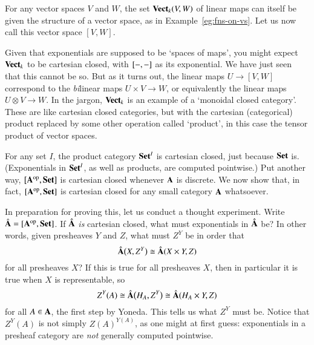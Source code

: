 \begin{remark}
For any vector spaces $V$ and $W$, the set $\mathbf{Vect}_k(V, W)$ of linear maps
can itself be given the structure of a vector space, as in
Example~\ref{eg:fns-on-vs}.  Let us now call this vector space $[V, W]$.

Given that exponentials are supposed to be `spaces of maps', you might
expect $\mathbf{Vect}_k$ to be cartesian closed, with $[-, -]$ as its
exponential.  We have just seen that this cannot be so.  But as it turns
out, the linear maps $U \to [V, W]$ correspond to the \emph{bi}linear%
%
%
maps $U \times V \to W$, or equivalently the linear maps $U \otimes V \to
W$.%
%
%
In the jargon, $\mathbf{Vect}_k$ is an example of a `monoidal%
%
%
%
closed category'.  These are like cartesian closed categories, but with the
cartesian (categorical) product replaced by some other operation called
`product', in this case the tensor product of vector spaces.
\end{remark}

For any set $I$, the product category $\mathbf{Set}^I$ is cartesian closed, just
because $\mathbf{Set}$ is.  (Exponentials in $\mathbf{Set}^I$, as well as products, are
computed pointwise.)  Put another way, $[\mathbf{A}^{\mathrm{op}},\mathbf{Set}]$ is cartesian
closed whenever $\mathbf{A}$ is discrete.  We now show that, in fact,
$[\mathbf{A}^{\mathrm{op}},\mathbf{Set}]$ is cartesian closed for any small category $\mathbf{A}$
whatsoever.  

In preparation for proving this, let us conduct a thought%
%
%
experiment.  Write $\psh{\scat{A}}%
%
\ntn{psh}
%
 = \pshf{\scat{A}}$.  If $\hat{\mathbf{A}}$ \emph{is} cartesian
closed, what must exponentials in $\hat{\mathbf{A}}$ be?  In other words, given
presheaves $Y$ and $Z$, what must $Z^Y$ be in order that
% 
\begin{equation}        
\label{eq:cc-pshf}
\hat{\mathbf{A}}\bigl(X, Z^Y\bigr)
\cong
\hat{\mathbf{A}}(X \times Y, Z)
\end{equation}
% 
for all presheaves $X$?  If this is true for all presheaves $X$, then in
particular it is true when $X$ is representable, so
\[
Z^Y(A)
\cong
\hat{\mathbf{A}}\bigl(H_A, Z^Y\bigr)
\cong
\hat{\mathbf{A}}(H_A \times Y, Z) 
\]
for all $A \in \mathbf{A}$, the first step by Yoneda.  This tells us what
$Z^Y$ must be.  Notice that $Z^Y(A)$ is not simply $Z(A)^{Y(A)}$, as one
might at first guess: exponentials in a presheaf category are \emph{not}
generally computed pointwise.%
%
%


